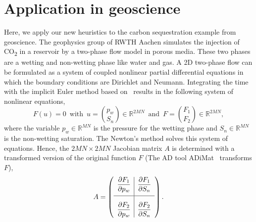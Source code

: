 \documentclass[12pt, twoside,a4paper,toc=bibliography]{scrbook}
\newcommand{\field}[1]{\mathbb{#1}}
\newcommand{\R}{\ensuremath{\field{R}}}
\begin{document}



\clearpage
\section{Application in geoscience}
\label{s.application}
Here, we apply our new heuristics to the carbon sequestration example from geoscience.
The geophysics group of RWTH Aachen simulates the injection of CO\textsubscript{2}
in a reservoir by a two-phase flow model in porous media. These two phases are a wetting
and non-wetting phase like water and gas. A 2D two-phase flow can be formulated as
a system of coupled nonlinear partial differential equations in which the boundary conditions
are Dirichlet and Neumann. Integrating the time with the implicit Euler method
based on~\cite{Lulfesmann2012Fap} results in the following system of nonlinear equations,
$$F(u)=0 \, \text{ with } \, u = \binom{p_w}{S_n} \in \R^{2MN} \, \text{ and } \, F = \binom{F_1}{F_2} \in \R^{2MN},$$
where the variable $p_w \in \R^{MN}$ is the pressure for the wetting phase and $S_n \in \R^{MN}$ is the non-wetting saturation. The Newton's method solves this system of equations.
Hence, the $2MN \times 2MN$ Jacobian matrix $A$ is determined with a transformed version of the original function $F$ (The AD tool \mbox{ADiMat}~\cite{Bischof2005AML} transforms $F$),
$$
A =
\left({\begin{array}{l|l}
	\displaystyle \frac{\partial F_1}{\partial p_w} & \displaystyle \frac{\partial F_1}{\partial S_n} \\[1em]
	\hline
	\displaystyle \frac{\partial F_2}{\partial p_w} \rule[-7.5pt]{0pt}{30pt} & \displaystyle \frac{\partial F_2}{\partial S_n} \\
 \end{array}} \right).
$$
\end{document}

